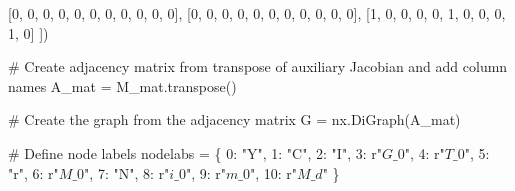 \documentclass[
  letterpaper,
  DIV=11,
  numbers=noendperiod]{scrreprt}
\newenvironment{Shaded}{\begin{snugshade}}{\end{snugshade}}
\newcommand{\CommentTok}[1]{\textcolor[rgb]{0.37,0.37,0.37}{#1}}
\newcommand{\DecValTok}[1]{\textcolor[rgb]{0.68,0.00,0.00}{#1}}
\newcommand{\NormalTok}[1]{\textcolor[rgb]{0.00,0.23,0.31}{#1}}
\newcommand{\OperatorTok}[1]{\textcolor[rgb]{0.37,0.37,0.37}{#1}}
\newcommand{\StringTok}[1]{\textcolor[rgb]{0.13,0.47,0.30}{#1}}
\newcommand{\VerbatimStringTok}[1]{\textcolor[rgb]{0.13,0.47,0.30}{#1}}
\begin{document}
\begin{tcolorbox}
\begin{Shaded}
\begin{Highlighting}[]
\NormalTok{    [}\DecValTok{0}\NormalTok{, }\DecValTok{0}\NormalTok{, }\DecValTok{0}\NormalTok{, }\DecValTok{0}\NormalTok{, }\DecValTok{0}\NormalTok{, }\DecValTok{0}\NormalTok{, }\DecValTok{0}\NormalTok{, }\DecValTok{0}\NormalTok{, }\DecValTok{0}\NormalTok{, }\DecValTok{0}\NormalTok{, }\DecValTok{0}\NormalTok{],}
\NormalTok{    [}\DecValTok{0}\NormalTok{, }\DecValTok{0}\NormalTok{, }\DecValTok{0}\NormalTok{, }\DecValTok{0}\NormalTok{, }\DecValTok{0}\NormalTok{, }\DecValTok{0}\NormalTok{, }\DecValTok{0}\NormalTok{, }\DecValTok{0}\NormalTok{, }\DecValTok{0}\NormalTok{, }\DecValTok{0}\NormalTok{, }\DecValTok{0}\NormalTok{],}
\NormalTok{    [}\DecValTok{1}\NormalTok{, }\DecValTok{0}\NormalTok{, }\DecValTok{0}\NormalTok{, }\DecValTok{0}\NormalTok{, }\DecValTok{0}\NormalTok{, }\DecValTok{1}\NormalTok{, }\DecValTok{0}\NormalTok{, }\DecValTok{0}\NormalTok{, }\DecValTok{0}\NormalTok{, }\DecValTok{1}\NormalTok{, }\DecValTok{0}\NormalTok{]}
\NormalTok{])}

\CommentTok{\# Create adjacency matrix from transpose of auxiliary Jacobian and add column names}
\NormalTok{A\_mat }\OperatorTok{=}\NormalTok{ M\_mat.transpose()}

\CommentTok{\# Create the graph from the adjacency matrix}
\NormalTok{G }\OperatorTok{=}\NormalTok{ nx.DiGraph(A\_mat)}


\CommentTok{\# Define node labels}
\NormalTok{nodelabs }\OperatorTok{=}\NormalTok{ \{}
    \DecValTok{0}\NormalTok{: }\StringTok{"Y"}\NormalTok{,}
    \DecValTok{1}\NormalTok{: }\StringTok{"C"}\NormalTok{,}
    \DecValTok{2}\NormalTok{: }\StringTok{"I"}\NormalTok{,}
    \DecValTok{3}\NormalTok{: }\VerbatimStringTok{r"$G\_0$"}\NormalTok{,}
    \DecValTok{4}\NormalTok{: }\VerbatimStringTok{r"$T\_0$"}\NormalTok{,}
    \DecValTok{5}\NormalTok{: }\StringTok{"r"}\NormalTok{,}
    \DecValTok{6}\NormalTok{: }\VerbatimStringTok{r"$M\_0$"}\NormalTok{,}
    \DecValTok{7}\NormalTok{: }\StringTok{"N"}\NormalTok{,}
    \DecValTok{8}\NormalTok{: }\VerbatimStringTok{r"$i\_0$"}\NormalTok{,}
    \DecValTok{9}\NormalTok{: }\VerbatimStringTok{r"$m\_0$"}\NormalTok{,}
    \DecValTok{10}\NormalTok{: }\VerbatimStringTok{r"$M\_d$"}
\NormalTok{\}}


\end{Highlighting}
\end{Shaded}
\end{tcolorbox}
\end{document}
